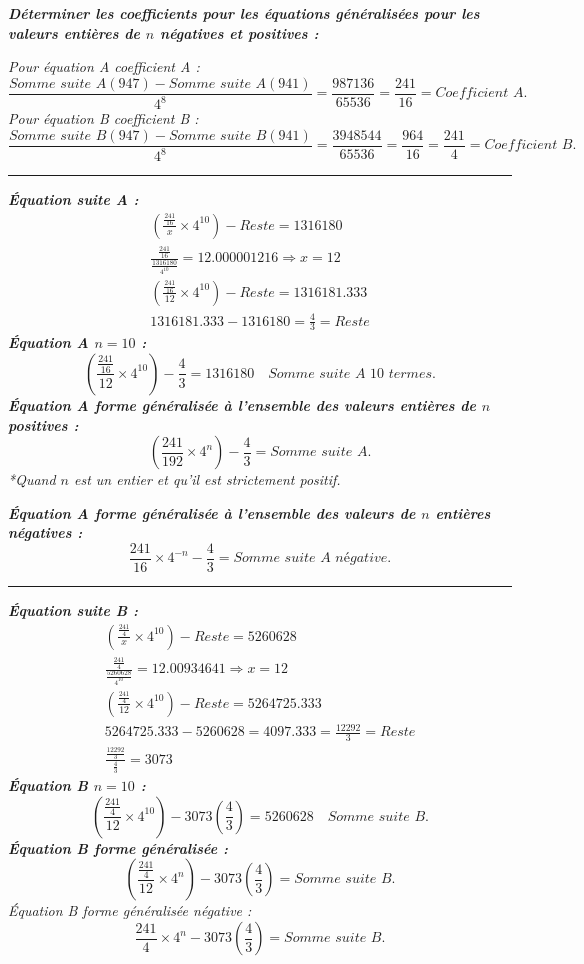 \documentclass[11pt,a4paper]{article}
\begin{document}
\noindent\textbf{\textit{Déterminer les coefficients pour les équations généralisées pour les valeurs entières de $n$ négatives et positives :}}

\noindent\textit{Pour équation A coefficient A :}
\[
\frac{\textit{Somme suite A}(947)-\textit{Somme suite A}(941)}{4^{8}}=\frac{987136}{65536}=\frac{241}{16}=\textit{Coefficient A.}
\]
\noindent\textit{Pour équation B coefficient B :}
\[
\frac{\textit{Somme suite B}(947)-\textit{Somme suite B}(941)}{4^{8}}=\frac{3948544}{65536}=\frac{964}{16}=\frac{241}{4}=\textit{Coefficient B.}
\]
\noindent\rule{\linewidth}{0.4pt}

\noindent\textbf{\textit{Équation suite A :}}
\begin{gather*}
\left(\frac{\frac{241}{16}}{x}\times4^{10}\right)-\textit{Reste}=1316180\\
\frac{\frac{241}{16}}{\frac{1316180}{4^{10}}}=12.000001216\Longrightarrow x=12\\
\left(\frac{\frac{241}{16}}{12}\times4^{10}\right)-\textit{Reste}=1316181.333\\
1316181.333-1316180=\frac{4}{3}=\textit{Reste}
\end{gather*}
\noindent\textbf{\textit{Équation A $n=10$ :}}
\[
\left(\frac{\frac{241}{16}}{12}\times4^{10}\right)-\frac{4}{3}=1316180\quad\textit{Somme suite A 10 termes.}
\]
\noindent\textbf{\textit{Équation A forme généralisée à l’ensemble des valeurs entières de $n$ positives :}}
\[
\left(\frac{241}{192}\times4^{n}\right)-\frac{4}{3}=\textit{Somme suite A.}
\]
\noindent\textit{*Quand $n$ est un entier et qu'il est strictement positif.}

\noindent\textbf{\textit{Équation A forme généralisée à l’ensemble des valeurs de $n$ entières négatives :}}
\[
\frac{241}{16}\times4^{-n}-\frac{4}{3}=\textit{Somme suite A négative.}
\]
\noindent\rule{\linewidth}{0.4pt}

\noindent\textbf{\textit{Équation suite B :}}
\begin{gather*}
\left(\frac{\frac{241}{4}}{x}\times4^{10}\right)-\textit{Reste}=5260628\\
\frac{\frac{241}{4}}{\frac{5260628}{4^{10}}}=12.00934641\Longrightarrow x=12\\
\left(\frac{\frac{241}{4}}{12}\times4^{10}\right)-\textit{Reste}=5264725.333\\
5264725.333-5260628=4097.333=\frac{12292}{3}=\textit{Reste}\\
\frac{\frac{12292}{3}}{\frac{4}{3}}=3073
\end{gather*}
\noindent\textbf{\textit{Équation B $n=10$ :}}
\[
\left(\frac{\frac{241}{4}}{12}\times4^{10}\right)-3073\left(\frac{4}{3}\right)=5260628\quad\textit{Somme suite B.}
\]
\noindent\textbf{\textit{Équation B forme généralisée :}}
\[
\left(\frac{\frac{241}{4}}{12}\times4^{n}\right)-3073\left(\frac{4}{3}\right)=\textit{Somme suite B.}
\]
\noindent\textit{Équation B forme généralisée négative :}
\[
\frac{241}{4}\times4^{n}-3073\left(\frac{4}{3}\right)=\textit{Somme suite B.}
\]
\end{document}
